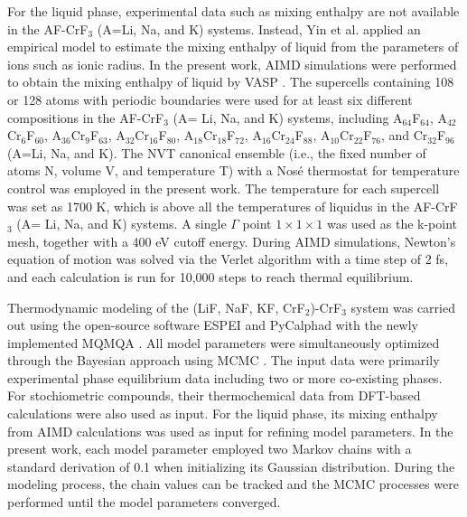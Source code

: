For the liquid phase, experimental data such as mixing enthalpy are not available in the AF-CrF${_3}$ (A=Li, Na, and K) systems. Instead, Yin et al. \cite{yin2018thermodynamic, yin2015thermodynamic, yin2014thermodynamic} applied an empirical model to estimate the mixing enthalpy of liquid from the parameters of ions such as ionic radius. In the present work, AIMD simulations were performed to obtain the mixing enthalpy of liquid by VASP \cite{kresse1996efficient}. The supercells containing 108 or 128 atoms with periodic boundaries were used for at least six different compositions in the AF-CrF${_3}$ (A= Li, Na, and K) systems, including A$_{64}$F$_{64}$, A$_{42}$Cr$_6$F$_{60}$, A$_{36}$Cr$_9$F$_{63}$, A$_{32}$Cr$_{16}$F$_{80}$, A$_{18}$Cr$_{18}$F$_{72}$, A$_{16}$Cr$_{24}$F$_{88}$, A$_{10}$Cr$_{22}$F$_{76}$, and Cr$_{32}$F$_{96}$ (A=Li, Na, and K). The NVT canonical ensemble (i.e., the fixed number of atoms N, volume V, and temperature T) with a Nosé thermostat for temperature control \cite{nose1984unified} was employed in the present work. The temperature for each supercell was set as 1700 K, which is above all the temperatures of liquidus in the AF-CrF${_3}$ (A= Li, Na, and K) systems. A single $\Gamma$ point $1\times1\times1$ was used as the k-point mesh, together with a 400 eV cutoff energy. During AIMD simulations, Newton’s equation of motion was solved via the Verlet algorithm with a time step of 2 fs, and each calculation is run for 10,000 steps to reach thermal equilibrium.

Thermodynamic modeling of the (LiF, NaF, KF, CrF${_2}$)-CrF${_3}$ system was carried out using the open-source software ESPEI \cite{bocklund2019espei} and PyCalphad \cite{otis2017pycalphad} with the newly implemented MQMQA \cite{palma2023thermodynamic}. All model parameters were simultaneously optimized through the Bayesian approach using MCMC \cite{bocklund2019espei}. The input data were primarily experimental phase equilibrium data including two or more co-existing phases. For stochiometric compounds, their thermochemical data from DFT-based calculations were also used as input. For the liquid phase, its mixing enthalpy from AIMD calculations was used as input for refining model parameters. In the present work, each model parameter employed two Markov chains with a standard derivation of 0.1 when initializing its Gaussian distribution. During the modeling process, the chain values can be tracked and the MCMC processes were performed until the model parameters converged.

